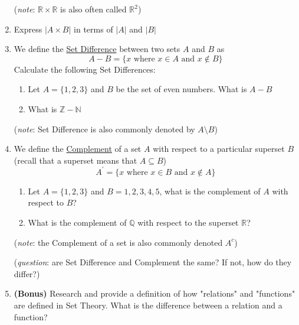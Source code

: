 \documentclass{article}
\begin{document}
\begin{enumerate}[label=(\alph*)]
          (\textit{note}: $\mathbb{R} \times \mathbb{R}$ is also often called $\mathbb{R}^2$)
    \item Express $|A \times B|$ in terms of $|A|$ and $|B|$
    \item We define the \underline{Set Difference} between two sets $A$ and $B$ as
          \begin{equation*}
              A - B = \{ x \text{ where } x \in A \text{ and } x \notin B \}
          \end{equation*}
          Calculate the following Set Differences:
          \begin{enumerate}[label=(\roman*)]
              \item Let $A =\{ 1, 2, 3\}$ and $B$ be the set of even numbers. What is $A - B$
              \item What is $\mathbb{Z} - \mathbb{N}$
          \end{enumerate}
          (\textit{note}: Set Difference is also commonly denoted by $A \setminus B$)
    \item We define the \underline{Complement} of a set $A$ with respect to a particular superset $B$ (recall that a superset means that $A \subseteq B$)
          \begin{equation*}
              A^{'} = \{ x \text{ where } x \in B \text{ and } x \notin A \}
          \end{equation*}
          \begin{enumerate}[label=(\roman*)]
              \item Let $A = \{1, 2, 3\}$ and $B = {1, 2, 3, 4, 5}$, what is the complement of $A$ with respect to $B$?
              \item What is the complement of $\mathbb{Q}$ with respect to the superset $\mathbb{R}$?
          \end{enumerate}
          (\textit{note}: the Complement of a set is also commonly denoted $A^c$)

          (\textit{question}: are Set Difference and Complement the same? If not, how do they differ?)
    \item \textbf{(Bonus)} Research and provide a definition of how "relations" and "functions" are defined in Set Theory. What is the difference between a relation and a function?
\end{enumerate}
\end{document}
